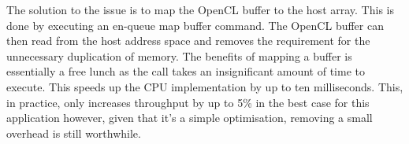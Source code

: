 The solution to the issue is to map the OpenCL buffer to the host array. This is
done by executing an en-queue map buffer command. The OpenCL buffer can then
read from the host address space and removes the requirement for the unnecessary
duplication of memory. The benefits of mapping a buffer is essentially a free
lunch as the call takes an insignificant amount of time to execute. This speeds
up the CPU implementation by up to ten milliseconds. This, in practice, only
increases throughput by up to 5\% in the best case for this application however,
given that it's a simple optimisation, removing a small overhead is still
worthwhile.
